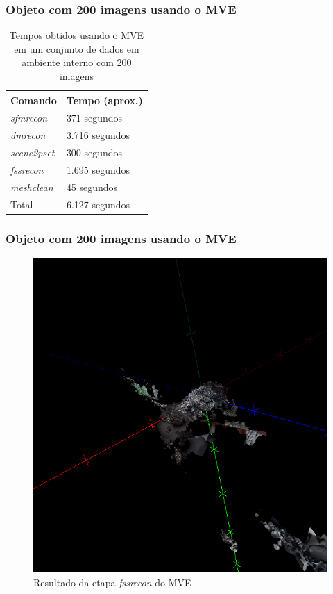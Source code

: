 \documentclass[table, usenames, svgnames, xcolor=dvipsnames]{beamer}
\begin{document}
\begin{frame}
\frametitle{\textbf{Objeto com 200 imagens usando o MVE}}
	\begin{table}[!h]
	\centering
	\caption{Tempos obtidos usando o MVE em um conjunto de dados em ambiente interno com 200 imagens}
	\label{tab:galinha200mve}
		\begin{tabular}{|l|l|}
			\hline
			Comando            & Tempo (aprox.)         \\ \hline
			\protect\emph{sfmrecon}  & 371 segundos   \\ \hline
			\protect\emph{dmrecon}   & 3.716 segundos \\ \hline
			\protect\emph{scene2pset} & 300 segundos   \\ \hline
			\protect\emph{fssrecon}  & 1.695 segundos \\ \hline
			\protect\emph{meshclean} & 45 segundos    \\ \hline
			Total & 6.127 segundos \\ \hline
		\end{tabular}
	\end{table}	
\end{frame}

\begin{frame}
\frametitle{\textbf{Objeto com 200 imagens usando o MVE}}
	\begin{figure}[!h]
		\centering
		\includegraphics[width=0.5\linewidth]{figs/galinhadmr.png}
		\caption{%
		Resultado da etapa \protect\emph{fssrecon} do MVE
		}\label{fig:galinhaFssr}
	\end{figure}
\end{frame}
\end{document}
